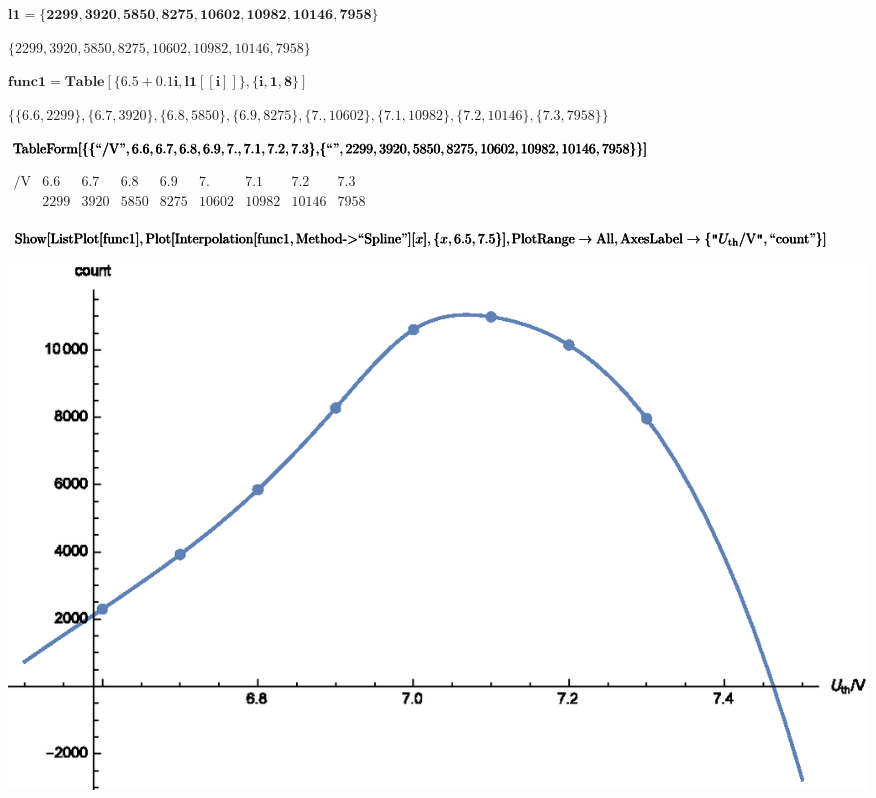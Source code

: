 \documentclass{article}
\newcommand{\unicode}[1]{{}}
\begin{document}
\begin{doublespace}
\noindent\(\pmb{\text{l1}=\{2299,3920,5850,8275,10602,10982,10146,7958\}}\)
\end{doublespace}

\begin{doublespace}
\noindent\(\{2299,3920,5850,8275,10602,10982,10146,7958\}\)
\end{doublespace}

\begin{doublespace}
\noindent\(\pmb{\text{func1}=\text{Table}[\{6.5+0.1i,\text{l1}[[i]]\},\{i,1,8\}]}\)
\end{doublespace}

\begin{doublespace}
\noindent\(\{\{6.6,2299\},\{6.7,3920\},\{6.8,5850\},\{6.9,8275\},\{7.,10602\},\{7.1,10982\},\{7.2,10146\},\{7.3,7958\}\}\)
\end{doublespace}

\begin{doublespace}
\noindent\(\pmb{\text{TableForm}[\{\{\text{{``}$\unicode{9608}\unicode{503c}$/V{''}},6.6,6.7,6.8,6.9,7.,7.1,7.2,7.3\},}\\
\pmb{\{\text{{``}$\unicode{8ba1}\unicode{6570}${''}},2299,3920,5850,8275,10602,10982,10146,7958\}\}]}\)
\end{doublespace}

\begin{doublespace}
\noindent\(\begin{array}{lllllllll}
 \text{$\unicode{9608}\unicode{503c}$/V} & 6.6 & 6.7 & 6.8 & 6.9 & 7. & 7.1 & 7.2 & 7.3 \\
 \unicode{8ba1}\unicode{6570} & 2299 & 3920 & 5850 & 8275 & 10602 & 10982 & 10146 & 7958 \\
\end{array}\)
\end{doublespace}

\begin{doublespace}
\noindent\(\pmb{\text{Show}[\text{ListPlot}[\text{func1}],\text{Plot}[\text{Interpolation}[\text{func1},\text{Method}\text{-$>$}\text{{``}Spline{''}}][x],\{x,6.5,7.5\}],}\\
\pmb{\left.\text{PlotRange}\to \text{All},\text{AxesLabel}\to \left\{\texttt{"}U_{\text{th}}\text{/V$\texttt{"}$},\text{{``}count{''}}\right\}\right]}\)
\end{doublespace}

\includegraphics{data_gr1.eps}
\end{document}
